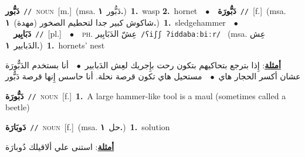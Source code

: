 \documentclass[10pt,a4paper,twoside]{article} %
\begin{document}
\begin{multicols}{2}
{\setlength\topsep{0pt}\textbf{\foreignlanguage{arabic}{دَبُّور}}\ {\color{gray}\texttt{//}\color{black}}\ \textsc{noun}\ [m.]\ \color{gray}(msa. \foreignlanguage{arabic}{دَبُّور}~\foreignlanguage{arabic}{\textbf{١.}})\color{black}\ \textbf{1.}~wasp  \textbf{2.}~hornet\ \ $\bullet$\ \ \setlength\topsep{0pt}\textbf{\foreignlanguage{arabic}{دَبُّورَة}}\ {\color{gray}\texttt{//}\color{black}}\ [f.]\ \color{gray}(msa. \foreignlanguage{arabic}{شاكوش كبير جدا لتحطيم الصخور (مهدة)}~\foreignlanguage{arabic}{\textbf{١.}})\color{black}\ \textbf{1.}~sledgehammer\ \ $\bullet$\ \ \setlength\topsep{0pt}\textbf{\foreignlanguage{arabic}{دَبَابِير}}\ {\color{gray}\texttt{//}\color{black}}\ [pl.]\ \ $\bullet$\ \ \textsc{ph.} \color{gray} \foreignlanguage{arabic}{عِشّ الدَبَابِير}\color{black}\ {\color{gray}\texttt{/{\sffamily ʕiʃʃ ʔiddabaːbiːr}/}\color{black}}\ \color{gray} (msa. \foreignlanguage{arabic}{عِش الدَبابير}~\foreignlanguage{arabic}{\textbf{١.}})\color{black}\ \textbf{1.}~hornets' nest\  \begin{flushright}\color{gray}\foreignlanguage{arabic}{\textbf{\underline{\foreignlanguage{arabic}{أمثلة}}}: إِذا بترجع بتحاكيهم بتكون رحت بإِجريك لعِش الدَبابير\ $\bullet$\ \  أنا بستخدم الدَبٌّورَة عشان أكسر الحجار هاي\ $\bullet$\ \  مستحيل هاي تكون قرصة نحلة. أنا حاسس إِنها قرصة دَبُّور}\end{flushright}\color{black}} \vspace{2mm}

{\setlength\topsep{0pt}\textbf{\foreignlanguage{arabic}{دَبُّورَة}}\ {\color{gray}\texttt{//}\color{black}}\ \textsc{noun}\ [f.]\ \textbf{1.}~A large hammer-like tool is a maul (sometimes called a beetle)\ } \vspace{2mm}

{\setlength\topsep{0pt}\textbf{\foreignlanguage{arabic}{دَوبَارَة}}\ {\color{gray}\texttt{//}\color{black}}\ \textsc{noun}\ [f.]\ \color{gray}(msa. \foreignlanguage{arabic}{حل}~\foreignlanguage{arabic}{\textbf{١.}})\color{black}\ \textbf{1.}~solution\  \begin{flushright}\color{gray}\foreignlanguage{arabic}{\textbf{\underline{\foreignlanguage{arabic}{أمثلة}}}: استنى علي ألاقيلك دُوبارَة}\end{flushright}\color{black}} \vspace{2mm}


\end{multicols}
\end{document}
